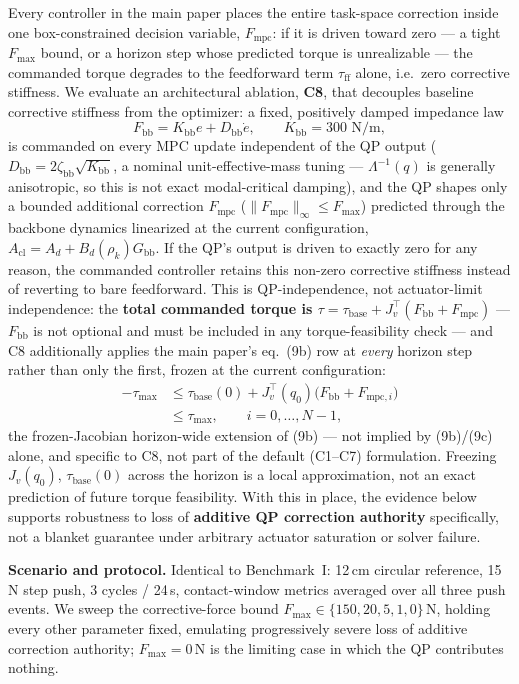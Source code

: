 \documentclass[journal]{IEEEtran}
\newcommand{\Laminv}{\Lambda^{-1}(q)}
\newcommand{\Fmpc}{F_{\text{mpc}}}
\newcommand{\Fmpck}[1]{F_{\text{mpc},#1}}
\begin{document}
Every controller in the main paper places the entire task-space
correction inside one box-constrained decision variable, $\Fmpc$: if it
is driven toward zero --- a tight $F_\text{max}$ bound, or a horizon step
whose predicted torque is unrealizable --- the commanded torque degrades
to the feedforward term $\tau_\text{ff}$ alone, i.e.\ zero corrective
stiffness. We evaluate an architectural ablation, \textbf{C8}, that
decouples baseline corrective stiffness from the optimizer: a fixed,
positively damped impedance law
\begin{equation*}
F_\text{bb}=K_\text{bb}e+D_\text{bb}\dot e,\qquad K_\text{bb}=300\text{ N/m},
\end{equation*}
is commanded on every MPC update independent of the QP output
($D_\text{bb}=2\zeta_\text{bb}\sqrt{K_\text{bb}}$, a nominal
unit-effective-mass tuning --- $\Laminv$ is generally anisotropic, so
this is not exact modal-critical damping), and the QP shapes only a
bounded additional correction $\Fmpc$ ($\|\Fmpc\|_\infty\le F_\text{max}$)
predicted through the backbone dynamics linearized at the current
configuration, $A_\text{cl}=A_d+B_d(\rho_k)G_\text{bb}$. If the QP's
output is driven to exactly zero for any reason, the commanded controller
retains this non-zero corrective stiffness instead of reverting to bare
feedforward. This is QP-independence, not actuator-limit independence:
the \textbf{total commanded torque is
$\tau=\tau_\text{base}+J_v^\top(F_\text{bb}+\Fmpc)$} --- $F_\text{bb}$ is
not optional and must be included in any torque-feasibility check ---
and C8 additionally applies the main paper's eq.~(9b) row at
\emph{every} horizon step rather than only the first, frozen at the
current configuration:
\begin{align*}
-\tau_\text{max}&\le\tau_\text{base}(0)+J_v^\top(q_0)
\bigl(F_\text{bb}+\Fmpck{i}\bigr)\\
&\le\tau_\text{max},\qquad i=0,\ldots,N-1,
\end{align*}
the frozen-Jacobian horizon-wide extension of (9b) --- not implied by
(9b)/(9c) alone, and specific to C8, not part of the default (C1--C7)
formulation. Freezing $J_v(q_0)$, $\tau_\text{base}(0)$ across the
horizon is a local approximation, not an exact prediction of future
torque feasibility. With this in place, the evidence below supports
robustness to loss of \textbf{additive QP correction authority}
specifically, not a blanket guarantee under arbitrary actuator saturation
or solver failure.

\textbf{Scenario and protocol.} Identical to Benchmark~I: 12\,cm
circular reference, 15\,N step push, 3 cycles / 24\,s, contact-window
metrics averaged over all three push events. We sweep the
corrective-force bound $F_\text{max}\in\{150,20,5,1,0\}$\,N, holding
every other parameter fixed, emulating progressively severe loss of
additive correction authority; $F_\text{max}=0$\,N is the limiting case
in which the QP contributes nothing.
\end{document}
